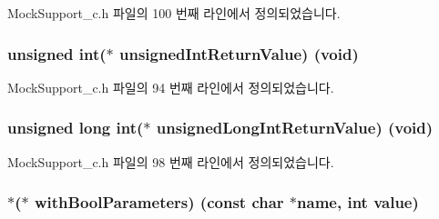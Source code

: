 Mock\+Support\+\_\+c.\+h 파일의 100 번째 라인에서 정의되었습니다.

\subsubsection[{\texorpdfstring{unsigned\+Int\+Return\+Value}{unsignedIntReturnValue}}]{\setlength{\rightskip}{0pt plus 5cm}unsigned int($\ast$ unsigned\+Int\+Return\+Value) (void)}\hypertarget{struct_s_mock_actual_call__c_a9f27bbb3d4783f56a4b65c909d0117c8}{}\label{struct_s_mock_actual_call__c_a9f27bbb3d4783f56a4b65c909d0117c8}


Mock\+Support\+\_\+c.\+h 파일의 94 번째 라인에서 정의되었습니다.

\subsubsection[{\texorpdfstring{unsigned\+Long\+Int\+Return\+Value}{unsignedLongIntReturnValue}}]{\setlength{\rightskip}{0pt plus 5cm}unsigned long int($\ast$ unsigned\+Long\+Int\+Return\+Value) (void)}\hypertarget{struct_s_mock_actual_call__c_a5dab94d3a7f6424d399581cf4f0f6152}{}\label{struct_s_mock_actual_call__c_a5dab94d3a7f6424d399581cf4f0f6152}


Mock\+Support\+\_\+c.\+h 파일의 98 번째 라인에서 정의되었습니다.

\subsubsection[{\texorpdfstring{with\+Bool\+Parameters}{withBoolParameters}}]{$\ast$($\ast$ with\+Bool\+Parameters) (const char $\ast$name, int value)}\hypertarget{struct_s_mock_actual_call__c_ad9ff61be2bc554f296b3541da38e2a9b}{}\label{struct_s_mock_actual_call__c_ad9ff61be2bc554f296b3541da38e2a9b}


